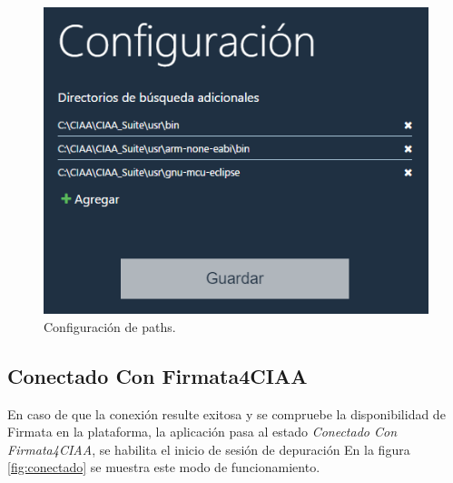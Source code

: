\begin{figure}[!htbp]
	\begin{center}  %
		\includegraphics*[width=12cm]{./Figures/Configuracion.PNG}
		\par\caption{Configuración de paths.}\label{fig:Configuracion}
	\end{center}
\end{figure}


\subsection{Conectado Con Firmata4CIAA}
\label{subsec:Conectado Con Firmata4CIAA}

En caso de que la conexión resulte exitosa y se compruebe la disponibilidad de Firmata en la plataforma, la aplicación pasa al estado \emph{Conectado Con Firmata4CIAA}, se habilita el inicio de sesión de depuración
En la figura \ref{fig:conectado} se muestra este modo de funcionamiento.


